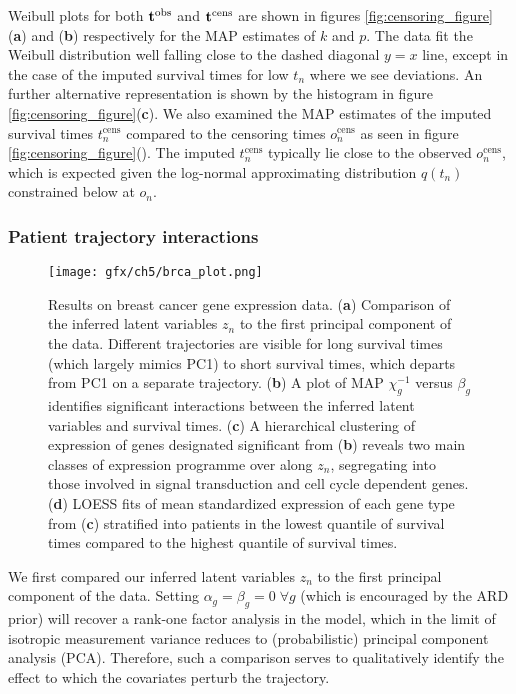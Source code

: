 Weibull plots for both $\mathbf{t}^{\text{obs}}$ and $\mathbf{t}^{\text{cens}}$ are shown in figures \ref{fig:censoring_figure} (\textbf{a}) and (\textbf{b}) respectively for the MAP estimates of $k$ and $p$. The data fit the Weibull distribution well falling close to the dashed diagonal $y=x$ line, except in the case of the imputed survival times for low $t_n$ where we see deviations.
An further alternative representation is shown by the histogram in figure \ref{fig:censoring_figure}(\textbf{c}).%
We also examined the MAP estimates of the imputed survival times $t_n^{\text{cens}}$ compared to the censoring times $o_n^{\text{cens}}$ as seen in figure \ref{fig:censoring_figure}(). The imputed $t_n^{\text{cens}}$ typically lie close to the observed $o_n^{\text{cens}}$,
which is expected given the log-normal approximating distribution $q(t_n)$ constrained below at $o_n$.

\subsubsection{Patient trajectory interactions}

\begin{figure}
  \centering
\texttt{[image: gfx/ch5/brca\_plot.png]}
\caption{Results on breast cancer gene expression data.
(\textbf{a}) Comparison of the inferred latent variables $z_n$ to the first principal component of the data. Different trajectories are visible for long survival times (which largely mimics PC1) to short survival times, which departs from PC1 on a separate trajectory.
(\textbf{b}) A plot of MAP $\chi_g^{-1}$ versus $\beta_g$ identifies significant interactions between the inferred latent variables and survival times.
(\textbf{c}) A hierarchical clustering of expression of genes designated significant from (\textbf{b}) reveals two main classes of expression programme over along $z_n$, segregating into those involved in signal transduction and cell cycle dependent genes.
(\textbf{d}) LOESS fits of mean standardized expression of each gene type from (\textbf{c}) stratified into patients in the lowest quantile of survival times compared to the highest quantile of survival times.
} \label{fig:brca}
\end{figure}

We first compared our inferred latent variables $z_n$ to the first principal component of the data. Setting $\alpha_g = \beta_g = 0\; \forall g$ (which is encouraged by the ARD prior) will recover a rank-one factor analysis in the model, which in the limit of isotropic measurement variance reduces to (probabilistic) principal component analysis (PCA). Therefore, such a comparison serves to qualitatively identify the effect to which the covariates perturb the trajectory.

